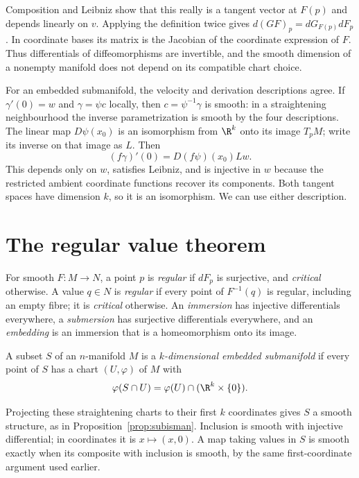 Composition and Leibniz show that this really is a tangent vector at $F(p)$ and depends linearly on $v$. Applying the definition twice gives $d(GF)_p=dG_{F(p)}dF_p$. In coordinate bases its matrix is the Jacobian of the coordinate expression of $F$. Thus differentials of diffeomorphisms are invertible, and the smooth dimension of a nonempty manifold does not depend on its compatible chart choice.

For an embedded submanifold, the velocity and derivation descriptions agree. If $\gamma'(0)=w$ and $\gamma=\psi c$ locally, then $c=\psi^{-1}\gamma$ is smooth: in a straightening neighbourhood the inverse parametrization is smooth by the four descriptions. The linear map $D\psi(x_0)$ is an isomorphism from $\R^k$ onto its image $T_pM$; write its inverse on that image as $L$. Then
\[
(f\gamma)'(0)=D(f\psi)(x_0)Lw.
\]
This depends only on $w$, satisfies Leibniz, and is injective in $w$ because the restricted ambient coordinate functions recover its components. Both tangent spaces have dimension $k$, so it is an isomorphism. We can use either description.

\section{The regular value theorem}

\begin{definition}
For smooth $F:M\to N$, a point $p$ is \emph{regular} if $dF_p$ is surjective, and \emph{critical} otherwise. A value $q\in N$ is \emph{regular} if every point of $F^{-1}(q)$ is regular, including an empty fibre; it is \emph{critical} otherwise. An \emph{immersion} has injective differentials everywhere, a \emph{submersion} has surjective differentials everywhere, and an \emph{embedding} is an immersion that is a homeomorphism onto its image.
\end{definition}

\begin{definition}
A subset $S$ of an $n$-manifold $M$ is a \emph{$k$-dimensional embedded submanifold} if every point of $S$ has a chart $(U,\varphi)$ of $M$ with
\[
\varphi(S\cap U)=\varphi(U)\cap(\R^k\times\{0\}).
\]
\end{definition}

Projecting these straightening charts to their first $k$ coordinates gives $S$ a smooth structure, as in Proposition~\ref{prop:subisman}. Inclusion is smooth with injective differential; in coordinates it is $x\mapsto(x,0)$. A map taking values in $S$ is smooth exactly when its composite with inclusion is smooth, by the same first-coordinate argument used earlier.

